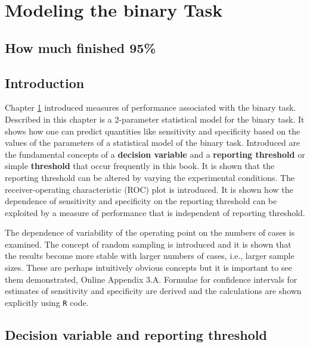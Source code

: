 \documentclass[
]{book}
\begin{document}
\hypertarget{binary-task-model}{%
\chapter{Modeling the binary Task}\label{binary-task-model}}

\hypertarget{binary-task-model-how-much-finished}{%
\section{How much finished 95\%}\label{binary-task-model-how-much-finished}}

\hypertarget{binary-task-model-intro}{%
\section{Introduction}\label{binary-task-model-intro}}

Chapter \ref{binary-task-model} introduced measures of performance associated with the binary task. Described in this chapter is a 2-parameter statistical model for the binary task. It shows how one can predict quantities like sensitivity and specificity based on the values of the parameters of a statistical model of the binary task. Introduced are the fundamental concepts of a \textbf{decision variable} and a \textbf{reporting threshold} or simple \textbf{threshold} that occur frequently in this book. It is shown that the reporting threshold can be altered by varying the experimental conditions. The receiver-operating characteristic (ROC) plot is introduced. It is shown how the dependence of sensitivity and specificity on the reporting threshold can be exploited by a measure of performance that is independent of reporting threshold.

The dependence of variability of the operating point on the numbers of cases is examined. The concept of random sampling is introduced and it is shown that the results become more stable with larger numbers of cases, i.e., larger sample sizes. These are perhaps intuitively obvious concepts but it is important to see them demonstrated, Online Appendix 3.A. Formulae for confidence intervals for estimates of sensitivity and specificity are derived and the calculations are shown explicitly using \texttt{R} code.

\hypertarget{binary-task-model-z-sample-model}{%
\section{Decision variable and reporting threshold}\label{binary-task-model-z-sample-model}}
\end{document}
